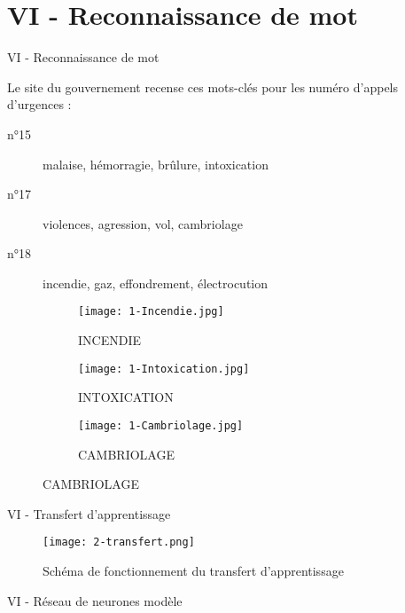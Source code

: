 
\section{VI - Reconnaissance de mot}
\begin{frame}{VI - Reconnaissance de mot}
	\begin{block}{}
		Le site du gouvernement recense ces mots-clés pour les numéro d'appels d'urgences : \\
		\begin{description}
			\item[n°15] malaise, hémorragie, brûlure, intoxication
			\item[n°17] violences, agression, vol, cambriolage
			\item[n°18] incendie, gaz, effondrement, électrocution
		\end{description}
	\end{block}
	\begin{figure}
		\begin{subfigure}[]{0.3\textwidth}
			\texttt{[image: 1-Incendie.jpg]}
			\caption{INCENDIE}
		\end{subfigure}
		\begin{subfigure}[]{0.3\textwidth}
			\texttt{[image: 1-Intoxication.jpg]}
			\caption{INTOXICATION}
		\end{subfigure}
		\begin{subfigure}[]{0.3\textwidth}
			\texttt{[image: 1-Cambriolage.jpg]}
			\caption{CAMBRIOLAGE}
		\end{subfigure}
	\end{figure}
\end{frame}


\begin{frame}{VI - Transfert d'apprentissage}
	\begin{figure}
		\texttt{[image: 2-transfert.png]}
		\caption{Schéma de fonctionnement du transfert d'apprentissage}
	\end{figure}
\end{frame}


\begin{frame}{VI - Réseau de neurones modèle}
	
\end{frame}


